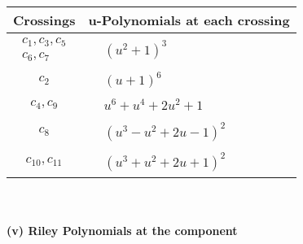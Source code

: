 \documentclass[1p]{elsarticle_modified}
\theoremstyle{definition}
\begin{document}
\begin{tabular}{m{50pt}|m{274pt}}
Crossings & \hspace{64pt}u-Polynomials at each crossing \\
\hline $$\begin{aligned}c_{1},c_{3},c_{5}\\c_{6},c_{7}\end{aligned}$$&$\begin{aligned}
&(u^2+1)^3
\end{aligned}$\\
\hline $$\begin{aligned}c_{2}\end{aligned}$$&$\begin{aligned}
&(u+1)^6
\end{aligned}$\\
\hline $$\begin{aligned}c_{4},c_{9}\end{aligned}$$&$\begin{aligned}
&u^6+u^4+2 u^2+1
\end{aligned}$\\
\hline $$\begin{aligned}c_{8}\end{aligned}$$&$\begin{aligned}
&(u^3- u^2+2 u-1)^2
\end{aligned}$\\
\hline $$\begin{aligned}c_{10},c_{11}\end{aligned}$$&$\begin{aligned}
&(u^3+u^2+2 u+1)^2
\end{aligned}$\\
\hline
\end{tabular}\\~\\
\newpage\renewcommand{\arraystretch}{1}
\flushleft \textbf{(v) Riley Polynomials at the component}\newline \\
\end{document}
